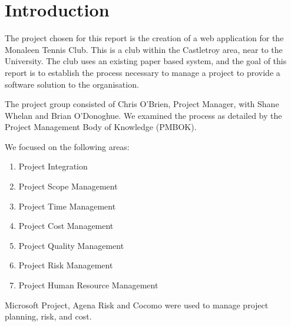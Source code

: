 \chapter{Introduction}

The project chosen for this report is the creation of a web application for the Monaleen Tennis Club. This is a club within the Castletroy area, near to the University. The club uses an existing paper based system, and the goal of this report is to establish the process necessary to manage a project to provide a software solution to the organisation. 

The project group consisted of Chris O'Brien, Project Manager, with Shane Whelan and Brian O'Donoghue. We examined the process as detailed by the Project Management Body of Knowledge (PMBOK).

We focused on the following areas:

\begin{enumerate}
\item Project Integration
\item Project Scope Management
\item Project Time Management
\item Project Cost Management
\item Project Quality Management
\item Project Risk Management
\item Project Human Resource Management
\end{enumerate}

Microsoft Project, Agena Risk and Cocomo were used to manage project planning, risk, and cost. 